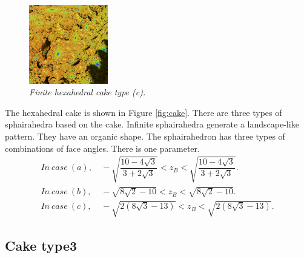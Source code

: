 \documentclass[suppldata, dvipdfmx]{interact}
\theoremstyle{plain}%
\theoremstyle{definition}
\theoremstyle{remark}
\theoremstyle{problemstyle}
\begin{document}
\begin{figure}[H]
\begin{minipage}{0.5\textwidth}
  \begin{minipage}[t]{0.24\textwidth}
   \centering
   \includegraphics[width=1.35in, height=1.35in,
   keepaspectratio]{./img/sphairahedron/hexahedralCake2/limitsetInf_c.png} 
  \end{minipage}
  \hspace*{\fill}
  \caption{\textit{Finite hexahedral cake type (c).}}
  \label{}
 \end{minipage}
\end{figure}

The hexahedral cake is shown in Figure \ref{fig:cake}. There are three
types of sphairahedra based on the cake.
Infinite sphairahedra generate a landscape-like pattern.
They have an organic shape.
The sphairahedron has three types of combinations of face angles.
There is one parameter.
\begin{align*}
 In~case~(a),&~- \sqrt{\dfrac{10 - 4 \sqrt{3}}{3 + 2 \sqrt{3}}} < z_B <\sqrt{\dfrac{10 - 4 \sqrt{3}}{3 + 2 \sqrt{3}}}.\\ 
 In~case~(b),&~-\sqrt{8\sqrt{2}-10} < z_B < \sqrt{8\sqrt{2} - 10}.\\
 In~case~(c),&~-\sqrt{2(8\sqrt{3} - 13)} < z_B < \sqrt{2(8\sqrt{3} - 13)}.
\end{align*}

\subsection{Cake type3}
\end{document}
